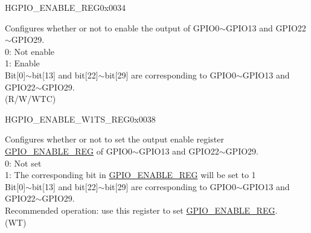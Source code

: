 \begin{register}{H}{GPIO\_ENABLE\_REG}{0x0034}\label{regdesc:GPIOENABLEREG}
%
\regnewline%
\begin{regdesc}\begin{reglist}
\label{fielddesc:GPIOENABLEDATA}\item [GPIO\_ENABLE\_DATA] Configures whether or not to enable the output of GPIO0$\sim$GPIO13 and GPIO22$\sim$GPIO29.\\
0: Not enable\\
1: Enable\\ 
Bit[0]$\sim$bit[13] and bit[22]$\sim$bit[29] are corresponding to GPIO0$\sim$GPIO13 and GPIO22$\sim$GPIO29. \\(R/W/WTC)
\end{reglist}\end{regdesc}
\end{register}


\begin{register}{H}{GPIO\_ENABLE\_W1TS\_REG}{0x0038}\label{regdesc:GPIOENABLEW1TSREG}
%
\regnewline%
\begin{regdesc}\begin{reglist}
\label{fielddesc:GPIOENABLEW1TS}\item [GPIO\_ENABLE\_W1TS] Configures whether or not to set the output enable register \hyperref[regdesc:GPIOENABLEREG]{GPIO\_ENABLE\_REG} of GPIO0$\sim$GPIO13 and GPIO22$\sim$GPIO29.\\
0: Not set\\
1: The corresponding bit in \hyperref[regdesc:GPIOENABLEREG]{GPIO\_ENABLE\_REG} will be set to 1\\
Bit[0]$\sim$bit[13] and bit[22]$\sim$bit[29] are corresponding to GPIO0$\sim$GPIO13 and GPIO22$\sim$GPIO29.\\
Recommended operation: use this register to set \hyperref[regdesc:GPIOENABLEREG]{GPIO\_ENABLE\_REG}.\\ (WT)
\end{reglist}\end{regdesc}
\end{register}


